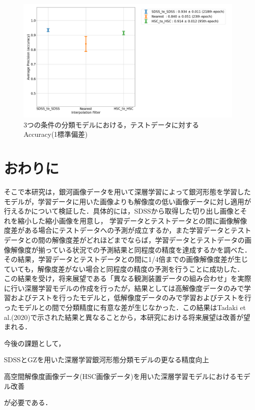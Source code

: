 \documentclass[a4j, 11pt]{jreport}
\begin{document}
\begin{figure}[H]
  \centering
  \includegraphics[width=1.0\hsize, keepaspectratio]{images/6syou/acc_with_errorbar_auto_epoch.png}
  \caption{3つの条件の分類モデルにおける，テストデータに対するAccuracy(1標準偏差)}
  \label{fig:6syou_zikkenn}
\end{figure}


\newpage
\chapter{おわりに}
そこで本研究は，銀河画像データを用いて深層学習によって銀河形態を学習したモデルが，学習データに用いた画像よりも解像度の低い画像データに対し適用が行えるかについて検証した．具体的には，SDSSから取得した切り出し画像とそれを縮小した縮小画像を用意し，
学習データとテストデータとの間に画像解像度差がある場合にテストデータへの予測が成立するか，また学習データとテストデータとの間の解像度差がどれほどまでならば，学習データとテストデータの画像解像度が揃っている状況での予測結果と同程度の精度を達成するかを調べた．
その結果，学習データとテストデータとの間に1/4倍までの画像解像度差が生じていても，解像度差がない場合と同程度の精度の予測を行うことに成功した．
この結果を受け，将来展望である「異なる観測装置データの組み合わせ」を実際に行い深層学習モデルの作成を行ったが，結果としては高解像度データのみで学習およびテストを行ったモデルと，低解像度データのみで学習およびテストを行ったモデルとの間で分類精度に有意な差が生じなかった．この結果はTadaki et al.(2020)で示された結果と異なることから，本研究における将来展望は改善が望まれる．

今後の課題として，
\begin{inparaenum}[(1)]
 \item SDSSとGZを用いた深層学習銀河形態分類モデルの更なる精度向上
 \item 高空間解像度画像データ(HSC画像データ)を用いた深層学習モデルにおけるモデル改善
\end{inparaenum}
が必要である．
\end{document}
